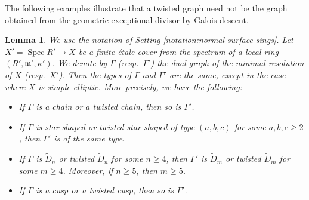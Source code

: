 \documentclass[12pt]{amsart}
\def\ge{\geqslant}
\def\tilde{\widetilde}
\def\Spec{\operatorname{Spec}}
\def\m{{\mathfrak m}}
\theoremstyle{plain}
\newtheorem{lem}[thm]{Lemma}
\theoremstyle{definition}
\theoremstyle{remark}
\newtheorem{defn and notation}[thm]{Definition and Notation}
\theoremstyle{plain}
\numberwithin{equation}{thm}
\begin{document}
The following examples illustrate that a twisted graph need not be the graph obtained from the geometric exceptional divisor by Galois descent.


\begin{lem}\label{lem:geom.irr}
We use the notation of Setting \ref{notation:normal surface sings}.
Let $X' = \Spec R' \to X$ be a finite \'etale cover from the spectrum of a local ring $(R', \m', \kappa')$.
We denote by $\Gamma$ (resp.~$\Gamma'$) the dual graph of the minimal resolution of $X$ (resp.~$X'$).
Then the types of $\Gamma$ and $\Gamma'$ are the same, except in the case where $X$ is simple elliptic.
More precisely, we have the following:
\begin{itemize}
    \item If $\Gamma$ is a chain or a twisted chain, then so is $\Gamma'$.
    \item If $\Gamma$ is star-shaped or twisted star-shaped of type $(a,b,c)$ for some $a,b,c \ge 2$, then $\Gamma'$ is of the same type.
    \item If $\Gamma$ is $\tilde{D}_n$ or twisted $\tilde{D}_n$ for some $n \ge 4$, then $\Gamma'$ is $\tilde{D}_m$ or twisted $\tilde{D}_m$ for some $m \ge 4$. Moreover, if $n\geq5$, then $m\geq5$.
    \item If $\Gamma$ is a cusp or a twisted cusp, then so is $\Gamma'$.
\end{itemize}
\end{lem}
\end{document}
